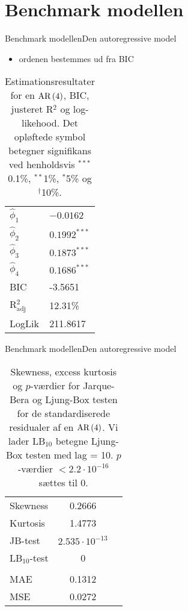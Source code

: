 \section{Benchmark modellen}
\begin{frame}{Benchmark modellen}{Den autoregressive model}
\begin{itemize}
\item ordenen bestemmes ud fra BIC
\end{itemize}
\begin{table}[h]
\center
\begin{tabular}{ll}
\toprule
$\widehat{\phi}_1$ &$ -0.0162 $ \\
$\widehat{\phi}_2$ & $0.1992^{***}$  \\
$\widehat{\phi}_3$ &$0.1873^{***}$  \\
$\widehat{\phi}_4$ &$0.1686^{***} $ \\ \midrule
BIC & -3.5651 \\
 R$^2_{\text{adj}}$ & 12.31\% \\
LogLik &  211.8617\\ \bottomrule
 \end{tabular}
\caption{Estimationsresultater for en \(\text{AR} \del{4}\), BIC, justeret R$^2$ og log-likehood. Det opløftede symbol betegner signifikans ved henholdsvis $^{***}$0.1\%, $^{**}$1\%, $^{*}$5\% og $^{\dagger}$10\%.} \label{tab:est_ar}
\end{table}
\end{frame}

\begin{frame}{Benchmark modellen}{Den autoregressive model}
\begin{table}
\center
\begin{tabular}{lcc} \toprule
Skewness & 0.2666 \\
Kurtosis & 1.4773 \\
JB-test & \(2.535 \cdot 10^{-13}\) \\ 
LB$_{10}$-test & 0 \\ 
\\
MAE & 0.1312 \\
MSE & 0.0272 \\ \bottomrule
\end{tabular}
\caption{Skewness, excess kurtosis og \(p\)-værdier for Jarque-Bera og Ljung-Box testen for de standardiserede residualer af en \(\text{AR} \del{4}\). Vi lader LB$_{10}$ betegne Ljung-Box testen med lag = 10. 
\(p\)-værdier \(< 2.2 \cdot 10^{-16}\) sættes til 0.} \label{tab:test_ar}
\end{table}
\end{frame}

